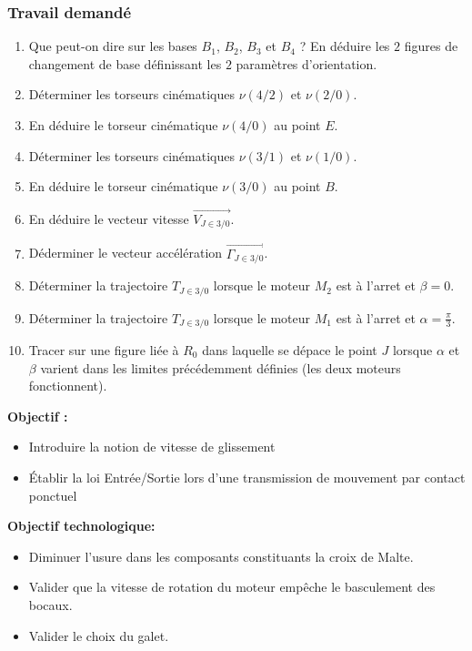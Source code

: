 \subsubsection{Travail demandé}
\begin{enumerate}
\item Que peut-on dire sur les bases $B_1$, $B_2$, $B_3$ et $B_4$ ? En déduire les $2$ figures de changement de base définissant les $2$ paramètres d'orientation.
\item Déterminer les torseurs cinématiques $\nu(4/2)$ et $\nu(2/0)$.
\item En déduire le torseur cinématique $\nu(4/0)$ au point $E$.
\item Déterminer les torseurs cinématiques $\nu(3/1)$ et $\nu(1/0)$.
\item En déduire le torseur cinématique $\nu(3/0)$ au point $B$.
\item En déduire le vecteur vitesse $\overrightarrow{V_{J \in 3/0}}$.
\item Déderminer le vecteur accélération $\overrightarrow{\Gamma_{J \in 3/0}}$.
\item Déterminer la trajectoire $T_{J \in 3/0}$ lorsque le moteur $M_2$ est à l'arret et $\beta=0$.
\item Déterminer la trajectoire $T_{J \in 3/0}$ lorsque le moteur $M_1$ est à l'arret et $\alpha=\frac{\pi}{3}$.
\item Tracer sur une figure liée à $R_0$ dans laquelle se dépace le point $J$ lorsque $\alpha$ et $\beta$ varient dans les limites précédemment définies (les deux moteurs fonctionnent).
\end{enumerate}
\newpage




\textbf{Objectif :} 
\begin{itemize}
\item Introduire la notion de vitesse de glissement
\item Établir la loi Entrée/Sortie lors d'une transmission de mouvement par contact ponctuel
\end{itemize}

\textbf{Objectif technologique:} 
\begin{itemize}
\item Diminuer l'usure dans les composants constituants la croix de Malte.
\item Valider que la vitesse de rotation du moteur empêche le basculement des bocaux.
\item Valider le choix du galet.
\end{itemize}

